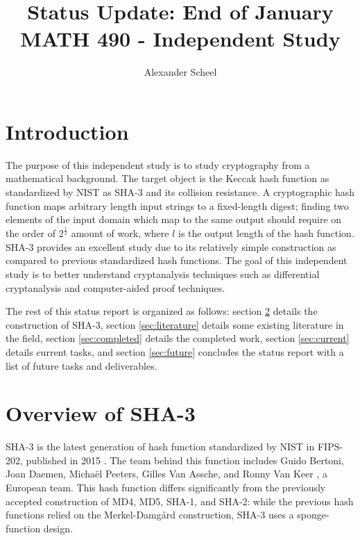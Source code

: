 \documentclass[10pt,twocolumn,twoside]{pnas-new}
\title{Status Update: End of January \\ MATH 490 - Independent Study}
\author[a]{Alexander Scheel}
\affil[a]{Iowa State University}
\begin{document}
\verticaladjustment{-2pt}

\maketitle

% 

\section{Introduction}

    The purpose of this independent study is to study cryptography from a
mathematical background. The target object is the Keccak hash function
as standardized by NIST as SHA-3 and its collision resistance. A cryptographic
hash function maps arbitrary length input strings to a fixed-length digest;
finding two elements of the input domain which map to the same output should
require on the order of $2^{\frac{l}{2}}$ amount of work, where $l$ is the
output length of the hash function. SHA-3 provides an excellent study due to
its relatively simple construction as compared to previous standardized hash
functions. The goal of this independent study is to better understand
cryptanalysis techniques such as differential cryptanalysis and computer-aided
proof techniques.

    The rest of this status report is organized as follows: section
\ref{sec:overview} details the construction of SHA-3, section
\ref{sec:literature} details some existing literature in the field, section
\ref{sec:completed} details the completed work, section \ref{sec:current}
details current tasks, and section \ref{sec:future} concludes the status
report with a list of future tasks and deliverables.

\section{Overview of SHA-3}\label{sec:overview}

    SHA-3 is the latest generation of hash function standardized by NIST in
FIPS-202, published in 2015 \cite{NIST202}. The team behind this function
includes Guido Bertoni, Joan Daemen, Micha{\"e}l Peeters, Gilles Van Assche,
and Ronny Van Keer \cite{KeccakTeam}, a European team. This hash function
differs significantly from the previously accepted construction of MD4, MD5,
SHA-1, and SHA-2: while the previous hash functions relied on the
Merkel-Damg{\aa}rd construction, SHA-3 uses a sponge-function design.
\end{document}
